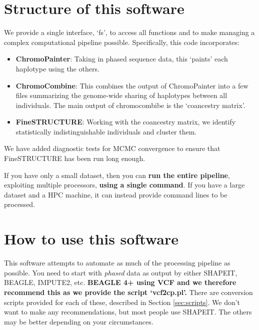 \documentclass[11pt]{article}
\begin{document}
\tableofcontents

\section{Structure of this software}

We provide a single interface, `fs', to access all functions and to make managing a complex computational pipeline possible. Specifically, this code incorporates:
\begin{itemize}
\item {\bf ChromoPainter}: Taking in phased sequence data, this `paints' each haplotype using the others.
\item {\bf ChromoCombine}: This combines the output of ChromoPainter into a few files summarizing the genome-wide sharing of haplotypes between all individuals. The main output of chromocombibe is the `coancestry matrix'.
\item {\bf FineSTRUCTURE}: Working with the coancestry matrix, we identify statistically indistinguishable individuals and cluster them.
\end{itemize}
We have added diagnostic tests for MCMC convergence to ensure that FineSTRUCTURE has been run long enough.

If you have only a small dataset, then you can {\bf run the entire pipeline}, exploiting multiple processors, {\bf using a single command}.  If you have a large dataset and a HPC machine, it can instead provide command lines to be processed.

\section{How to use this software}

This software attempts to automate as much of the processing pipeline as possible. You need to start with \emph{phased} data as output by either SHAPEIT, BEAGLE, IMPUTE2, etc. {\bf BEAGLE 4+ using VCF and we therefore recommend this as we provide the script `vcf2cp.pl'.} There are conversion scripts provided for each of these, described in Section \ref{sec:scripts}. We don't want to make any recommendations, but most people use SHAPEIT. The others may be better depending on your circumstances.
\end{document}
